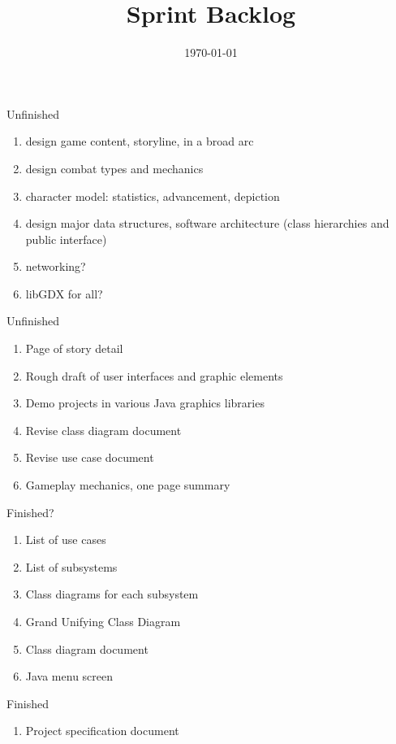 \documentclass[12pt]{article}
\title{Sprint Backlog}
\date{\today}
\begin{document}
\maketitle


\begin{section}{Unfinished}
\begin{enumerate}

\item design game content, storyline, in a broad arc
\item design combat types and mechanics
\item character model: statistics, advancement, depiction
\item design major data structures, software architecture (class
	hierarchies and public interface)
\item networking? 
\item libGDX for all?

\end{enumerate}
\end{section}

\begin{section}{Unfinished}
\begin{enumerate}
\item Page of story detail
\item Rough draft of user interfaces and graphic elements
\item Demo projects in various Java graphics libraries
\item Revise class diagram document
\item Revise use case document
\item Gameplay mechanics, one page summary
\end{enumerate}
\end{section}

\begin{section}{Finished?}
\begin{enumerate}
\item List of use cases
\item List of subsystems
\item Class diagrams for each subsystem
\item Grand Unifying Class Diagram
\item Class diagram document
\item Java menu screen
\end{enumerate}
\end{section}

\begin{section}{Finished}
\begin{enumerate}
\item Project specification document
\end{enumerate}
\end{section}
\end{document}
